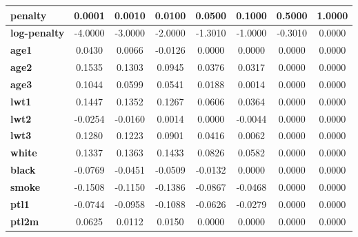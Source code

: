 \documentclass[a4paper,12pt]{article}
\begin{document}
\begin{table}[H]
\centering
\begin{tabular}{|l|c|c|c|c|c|c|c|}
\hline
\textbf{penalty}     & \textbf{0.0001} & \textbf{0.0010} & \textbf{0.0100} & \textbf{0.0500} & \textbf{0.1000} & \textbf{0.5000} & \textbf{1.0000} \\ \hline
\textbf{log-penalty} & -4.0000         & -3.0000         & -2.0000         & -1.3010         & -1.0000         & -0.3010         & 0.0000          \\ \hline
\textbf{age1}        & 0.0430          & 0.0066          & -0.0126         & 0.0000          & 0.0000          & 0.0000          & 0.0000          \\ \hline
\textbf{age2}        & 0.1535          & 0.1303          & 0.0945          & 0.0376          & 0.0317          & 0.0000          & 0.0000          \\ \hline
\textbf{age3}        & 0.1044          & 0.0599          & 0.0541          & 0.0188          & 0.0014          & 0.0000          & 0.0000          \\ \hline
\textbf{lwt1}        & 0.1447          & 0.1352          & 0.1267          & 0.0606          & 0.0364          & 0.0000          & 0.0000          \\ \hline
\textbf{lwt2}        & -0.0254         & -0.0160         & 0.0014          & 0.0000          & -0.0044         & 0.0000          & 0.0000          \\ \hline
\textbf{lwt3}        & 0.1280          & 0.1223          & 0.0901          & 0.0416          & 0.0062          & 0.0000          & 0.0000          \\ \hline
\textbf{white}       & 0.1337          & 0.1363          & 0.1433          & 0.0826          & 0.0582          & 0.0000          & 0.0000          \\ \hline
\textbf{black}       & -0.0769         & -0.0451         & -0.0509         & -0.0132         & 0.0000          & 0.0000          & 0.0000          \\ \hline
\textbf{smoke}       & -0.1508         & -0.1150         & -0.1386         & -0.0867         & -0.0468         & 0.0000          & 0.0000          \\ \hline
\textbf{ptl1}        & -0.0744         & -0.0958         & -0.1088         & -0.0626         & -0.0279         & 0.0000          & 0.0000          \\ \hline
\textbf{ptl2m}       & 0.0625          & 0.0112          & 0.0150          & 0.0000          & 0.0000          & 0.0000          & 0.0000          \\ \hline

\end{tabular}
\end{table}
\end{document}
